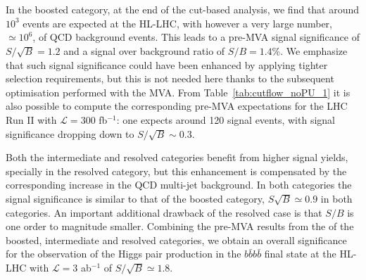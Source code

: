 \begin{table}[t]
  \centering
  \scriptsize
  
  $\,$ \\
  \vspace{0.5cm}
  
  $\,$ \\
  \vspace{0.5cm}
    
    \caption{\small The cross-sections, in femtobarns,
      for the signal and the various background
      processes at different steps of the
      cut-flow, for the resolved (upper table),
      intermediate (middle table) and boosted
      (lower table) categories, for the analysis
      without PU.
      In each case, we also provide the signal over
      background ratio, $S/B$, and the signal
      significance, $S/\sqrt{B}$, considering either
      the total background or only the $4b$ component, for
      a total integrated luminosity of $\mathcal{L}=3$ ab$^{-1}$.
      The different levels of the cut-flow are summarized
      in Table~\ref{tab:cutflowdetails}.
 \label{tab:cutflow_noPU_1}}
\end{table}



%
In the boosted category, at the end of the cut-based
analysis, we find that around $10^3$ events
are expected
at the HL-LHC, with however a very large number,
$\simeq 10^6$, of QCD background events.
%
This leads to a pre-MVA signal significance of
$S/\sqrt{B}=1.2$ and a signal over background
ratio of $S/B=1.4\%$.
%
We emphasize that such signal
significance could have been enhanced
by applying tighter selection requirements,
but this is not needed here thanks to the subsequent
optimisation  performed with the MVA.
%
From  Table~\ref{tab:cutflow_noPU_1}
it is also possible to compute the corresponding pre-MVA
expectations for the LHC Run II with
$\mathcal{L}=300$ fb$^{-1}$: one expects around
120 signal events, with signal significance dropping down to
$S/\sqrt{B}\sim 0.3$.
%


Both the intermediate and resolved categories benefit from higher signal yields,
specially in the resolved category, but this enhancement is compensated by the
corresponding
increase in the QCD multi-jet background.
%
In both categories
the signal significance is similar to that of the boosted category,
$S\sqrt{B}\simeq 0.9$ in both categories.
%
An important additional
drawback of the resolved case is
that $S/B$
is one order to magnitude smaller.
%
Combining the pre-MVA results
from the
of the boosted, intermediate and resolved categories,
we obtain an overall
significance for the observation of the Higgs pair production
in the $b\bar{b}b\bar{b}$ final
state at the HL-LHC with $\mathcal{L}=3$ ab$^{-1}$
of  $S/\sqrt{B} \simeq 1.8$.

